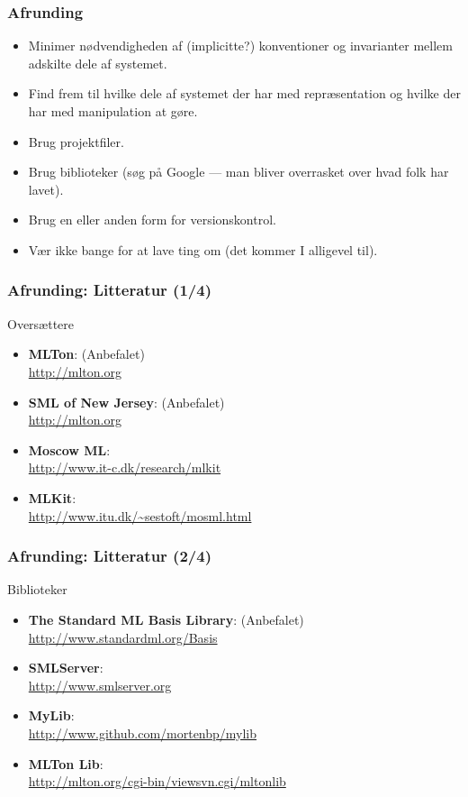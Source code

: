 \documentclass[slidestop,compress,mathserif, xcolor=table]{beamer}
\begin{document}
\begin{frame}
  \frametitle{Afrunding}

  \begin{itemize}
  \item Minimer nødvendigheden af (implicitte?) konventioner og invarianter
    mellem adskilte dele af systemet.
  \item Find frem til hvilke dele af systemet der har med repræsentation og
    hvilke der har med manipulation at gøre.
  \item Brug projektfiler.
  \item Brug biblioteker (søg på Google --- man bliver overrasket over hvad folk
    har lavet).
  \item Brug en eller anden form for versionskontrol.
  \item Vær ikke bange for at lave ting om (det kommer I alligevel til).
  \end{itemize}
\end{frame}

\begin{frame}
  \frametitle{Afrunding: Litteratur \quad (1/4)}
    Oversættere
    \begin{itemize}
    \item \textbf{MLTon}: (Anbefalet)\\
      {\scriptsize\url{http://mlton.org}}
    \item \textbf{SML of New Jersey}: (Anbefalet)\\
      {\scriptsize\url{http://mlton.org}}
    \item \textbf{Moscow ML}:\\
      {\scriptsize\url{http://www.it-c.dk/research/mlkit}}
    \item \textbf{MLKit}:\\
      {\scriptsize\url{http://www.itu.dk/~sestoft/mosml.html}}
    \end{itemize}
\end{frame}

\begin{frame}
  \frametitle{Afrunding: Litteratur \quad (2/4)}
    Biblioteker
    \begin{itemize}
    \item \textbf{The Standard ML Basis Library}: (Anbefalet)\\
      {\scriptsize\url{http://www.standardml.org/Basis}}
    \item \textbf{SMLServer}:\\
      {\scriptsize\url{http://www.smlserver.org}}
    \item \textbf{MyLib}:\\
      {\scriptsize\url{http://www.github.com/mortenbp/mylib}}
    \item \textbf{MLTon Lib}:\\
      {\scriptsize\url{http://mlton.org/cgi-bin/viewsvn.cgi/mltonlib}}
    \end{itemize}
\end{frame}
\end{document}

